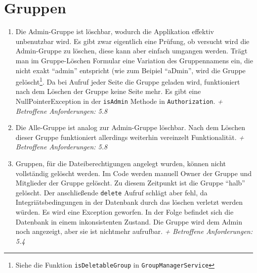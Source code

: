 \documentclass[12pt,DIV14,BCOR10mm,a4paper,parskip=half-,headsepline,headinclude,english,ngerman,bibliography=totocnumbered]{scrreprt}
\begin{document}
\section{Gruppen}
\begin{enumerate}[resume]
\item Die Admin-Gruppe ist löschbar, wodurch die Applikation effektiv unbenutzbar wird. Es gibt zwar eigentlich eine Prüfung, ob versucht wird die Admin-Gruppe zu löschen, diese kann aber einfach umgangen werden. Trägt man im Gruppe-Löschen Formular eine Variation des Gruppennamens ein, die nicht exakt \enquote{admin} entspricht (wie zum Beipiel \enquote{aDmin}, wird die Gruppe gelöscht\footnote{Siehe die Funktion \texttt{isDeletableGroup} in \texttt{GroupManagerService}}. Da bei Aufruf jeder Seite die Gruppe geladen wird, funktioniert nach dem Löschen der Gruppe keine Seite mehr. Es gibt eine NullPointerException in der \texttt{isAdmin} Methode in \texttt{Authorization}.\newline
\textit{+ Betroffene Anforderungen: 5.8}

\item Die Alle-Gruppe ist analog zur Admin-Gruppe löschbar. Nach dem Löschen dieser Gruppe funktioniert allerdings weiterhin vereinzelt Funktionalität.\newline
\textit{+ Betroffene Anforderungen: 5.8}

\item Gruppen, für die Dateiberechtigungen angelegt wurden, können nicht vollständig gelöscht werden. Im Code werden manuell Owner der Gruppe und Mitglieder der Gruppe gelöscht. Zu diesem Zeitpunkt ist die Gruppe \enquote{halb} gelöscht. Der anschließende \texttt{delete} Aufruf schlägt aber fehl, da Integriätsbedingungen in der Datenbank durch das löschen verletzt werden würden. Es wird eine Exception geworfen. In der Folge befindet sich die Datenbank in einem inkonsistenten Zustand. Die Gruppe wird dem Admin noch angezeigt, aber sie ist nichtmehr aufrufbar.\newline
\textit{+ Betroffene Anforderungen: 5.4}

\end{enumerate}
\end{document}
